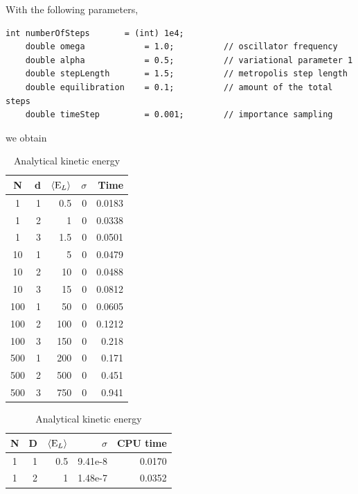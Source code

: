 \documentclass[english, a4paper]{article}
\begin{document}
With the following parameters,
\belowcaptionskip=-10pt
\begin{lstlisting}[label=parameters2,caption=Parameters importance sampling Metropolis system 1]
    int numberOfSteps       = (int) 1e4;
    double omega            = 1.0;          // oscillator frequency
    double alpha            = 0.5;          // variational parameter 1
    double stepLength       = 1.5;          // metropolis step length
    double equilibration    = 0.1;          // amount of the total steps
    double timeStep         = 0.001;        // importance sampling
\end{lstlisting}
we obtain
\begin{table}[H]
      \begin{minipage}{.5\linewidth}
  \centering
  \begin{tabular}{ | c | r | r | r | r |}
    \hline
    N& d& $\langle {\textrm E_L}\rangle$& $\sigma$& Time \\*
    \hline
    1& 1& 0.5& 0& 0.0183 \\*
    \hline
    1& 2& 1& 0&  0.0338\\*
    \hline
    1& 3& 1.5& 0&  0.0501\\*
    \hline
    10& 1& 5& 0&  0.0479\\*
    \hline
    10& 2& 10& 0&  0.0488\\*
    \hline
    10& 3& 15& 0&  0.0812\\*
    \hline
    100& 1& 50& 0&  0.0605\\*
    \hline
    100& 2& 100& 0&  0.1212\\*
    \hline
    100& 3& 150& 0&  0.218\\*
    \hline
    500& 1& 200& 0&  0.171\\*
    \hline
    500& 2& 500& 0&  0.451\\*
    \hline
    500& 3& 750& 0&  0.941\\*
    \hline
  \end{tabular}
  \caption{Analytical kinetic energy}
  \label{tab:Tabell3}
  \end{minipage}
  \begin{minipage}{.5\linewidth}
   \centering
     \begin{tabular}{ | c | r | r | r | r |}
    \hline
    N& D& $\langle {\textrm E_L}\rangle$& $\sigma$& CPU time \\*
    \hline
    1& 1& 0.5& 9.41e-8& 0.0170 \\*
    \hline
    1& 2& 1& 1.48e-7&  0.0352\\*
    \hline

\end{tabular}
\end{minipage}
\end{table}
\end{document}
